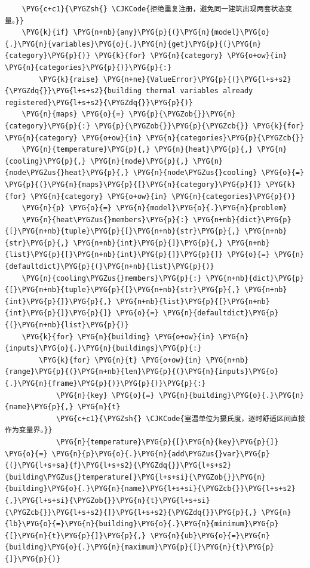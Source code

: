 \begin{Verbatim}
    \PYG{c+c1}{\PYGZsh{} \CJKCode{拒绝重复注册，避免同一建筑出现两套状态变量。}}
    \PYG{k}{if} \PYG{n+nb}{any}\PYG{p}{(}\PYG{n}{model}\PYG{o}{.}\PYG{n}{variables}\PYG{o}{.}\PYG{n}{get}\PYG{p}{(}\PYG{n}{category}\PYG{p}{)} \PYG{k}{for} \PYG{n}{category} \PYG{o+ow}{in} \PYG{n}{categories}\PYG{p}{)}\PYG{p}{:}
        \PYG{k}{raise} \PYG{n+ne}{ValueError}\PYG{p}{(}\PYG{l+s+s2}{\PYGZdq{}}\PYG{l+s+s2}{building thermal variables already registered}\PYG{l+s+s2}{\PYGZdq{}}\PYG{p}{)}
    \PYG{n}{maps} \PYG{o}{=} \PYG{p}{\PYGZob{}}\PYG{n}{category}\PYG{p}{:} \PYG{p}{\PYGZob{}}\PYG{p}{\PYGZcb{}} \PYG{k}{for} \PYG{n}{category} \PYG{o+ow}{in} \PYG{n}{categories}\PYG{p}{\PYGZcb{}}
    \PYG{n}{temperature}\PYG{p}{,} \PYG{n}{heat}\PYG{p}{,} \PYG{n}{cooling}\PYG{p}{,} \PYG{n}{mode}\PYG{p}{,} \PYG{n}{node\PYGZus{}heat}\PYG{p}{,} \PYG{n}{node\PYGZus{}cooling} \PYG{o}{=} \PYG{p}{(}\PYG{n}{maps}\PYG{p}{[}\PYG{n}{category}\PYG{p}{]} \PYG{k}{for} \PYG{n}{category} \PYG{o+ow}{in} \PYG{n}{categories}\PYG{p}{)}
    \PYG{n}{p} \PYG{o}{=} \PYG{n}{model}\PYG{o}{.}\PYG{n}{problem}
    \PYG{n}{heat\PYGZus{}members}\PYG{p}{:} \PYG{n+nb}{dict}\PYG{p}{[}\PYG{n+nb}{tuple}\PYG{p}{[}\PYG{n+nb}{str}\PYG{p}{,} \PYG{n+nb}{str}\PYG{p}{,} \PYG{n+nb}{int}\PYG{p}{]}\PYG{p}{,} \PYG{n+nb}{list}\PYG{p}{[}\PYG{n+nb}{int}\PYG{p}{]}\PYG{p}{]} \PYG{o}{=} \PYG{n}{defaultdict}\PYG{p}{(}\PYG{n+nb}{list}\PYG{p}{)}
    \PYG{n}{cooling\PYGZus{}members}\PYG{p}{:} \PYG{n+nb}{dict}\PYG{p}{[}\PYG{n+nb}{tuple}\PYG{p}{[}\PYG{n+nb}{str}\PYG{p}{,} \PYG{n+nb}{int}\PYG{p}{]}\PYG{p}{,} \PYG{n+nb}{list}\PYG{p}{[}\PYG{n+nb}{int}\PYG{p}{]}\PYG{p}{]} \PYG{o}{=} \PYG{n}{defaultdict}\PYG{p}{(}\PYG{n+nb}{list}\PYG{p}{)}
    \PYG{k}{for} \PYG{n}{building} \PYG{o+ow}{in} \PYG{n}{inputs}\PYG{o}{.}\PYG{n}{buildings}\PYG{p}{:}
        \PYG{k}{for} \PYG{n}{t} \PYG{o+ow}{in} \PYG{n+nb}{range}\PYG{p}{(}\PYG{n+nb}{len}\PYG{p}{(}\PYG{n}{inputs}\PYG{o}{.}\PYG{n}{frame}\PYG{p}{)}\PYG{p}{)}\PYG{p}{:}
            \PYG{n}{key} \PYG{o}{=} \PYG{n}{building}\PYG{o}{.}\PYG{n}{name}\PYG{p}{,} \PYG{n}{t}
            \PYG{c+c1}{\PYGZsh{} \CJKCode{室温单位为摄氏度，逐时舒适区间直接作为变量界。}}
            \PYG{n}{temperature}\PYG{p}{[}\PYG{n}{key}\PYG{p}{]} \PYG{o}{=} \PYG{n}{p}\PYG{o}{.}\PYG{n}{add\PYGZus{}var}\PYG{p}{(}\PYG{l+s+sa}{f}\PYG{l+s+s2}{\PYGZdq{}}\PYG{l+s+s2}{building\PYGZus{}temperature[}\PYG{l+s+si}{\PYGZob{}}\PYG{n}{building}\PYG{o}{.}\PYG{n}{name}\PYG{l+s+si}{\PYGZcb{}}\PYG{l+s+s2}{,}\PYG{l+s+si}{\PYGZob{}}\PYG{n}{t}\PYG{l+s+si}{\PYGZcb{}}\PYG{l+s+s2}{]}\PYG{l+s+s2}{\PYGZdq{}}\PYG{p}{,} \PYG{n}{lb}\PYG{o}{=}\PYG{n}{building}\PYG{o}{.}\PYG{n}{minimum}\PYG{p}{[}\PYG{n}{t}\PYG{p}{]}\PYG{p}{,} \PYG{n}{ub}\PYG{o}{=}\PYG{n}{building}\PYG{o}{.}\PYG{n}{maximum}\PYG{p}{[}\PYG{n}{t}\PYG{p}{]}\PYG{p}{)}

\end{Verbatim}
